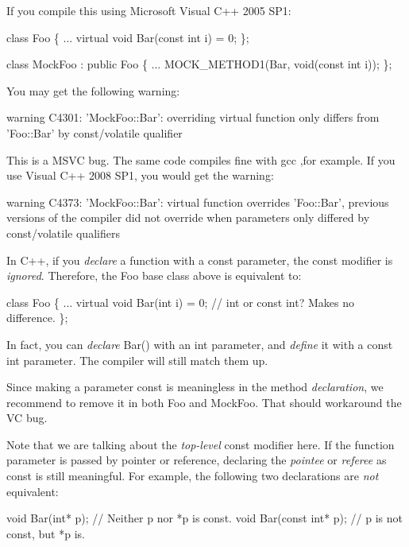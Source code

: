 If you compile this using Microsoft Visual C++ 2005 S\+P1\+: 
\begin{DoxyCode}
class Foo \{
  ...
  virtual void Bar(const int i) = 0;
\};

class MockFoo : public Foo \{
  ...
  MOCK\_METHOD1(Bar, void(const int i));
\};
\end{DoxyCode}
 You may get the following warning\+: 
\begin{DoxyCode}
warning C4301: 'MockFoo::Bar': overriding virtual function only differs from 'Foo::Bar' by const/volatile
       qualifier
\end{DoxyCode}


This is a M\+S\+VC bug. The same code compiles fine with gcc ,for example. If you use Visual C++ 2008 S\+P1, you would get the warning\+: 
\begin{DoxyCode}
warning C4373: 'MockFoo::Bar': virtual function overrides 'Foo::Bar', previous versions of the compiler did
       not override when parameters only differed by const/volatile qualifiers
\end{DoxyCode}


In C++, if you {\itshape declare} a function with a {\ttfamily const} parameter, the {\ttfamily const} modifier is {\itshape ignored}. Therefore, the {\ttfamily Foo} base class above is equivalent to\+: 
\begin{DoxyCode}
class Foo \{
  ...
  virtual void Bar(int i) = 0;  // int or const int?  Makes no difference.
\};
\end{DoxyCode}


In fact, you can {\itshape declare} Bar() with an {\ttfamily int} parameter, and {\itshape define} it with a {\ttfamily const int} parameter. The compiler will still match them up.

Since making a parameter {\ttfamily const} is meaningless in the method {\itshape declaration}, we recommend to remove it in both {\ttfamily Foo} and {\ttfamily Mock\+Foo}. That should workaround the VC bug.

Note that we are talking about the {\itshape top-\/level} {\ttfamily const} modifier here. If the function parameter is passed by pointer or reference, declaring the {\itshape pointee} or {\itshape referee} as {\ttfamily const} is still meaningful. For example, the following two declarations are {\itshape not} equivalent\+: 
\begin{DoxyCode}
void Bar(int* p);        // Neither p nor *p is const.
void Bar(const int* p);  // p is not const, but *p is.
\end{DoxyCode}


